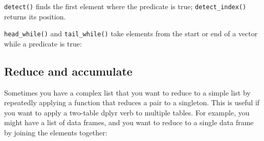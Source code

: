 \documentclass[]{book}
\newenvironment{Shaded}{\begin{snugshade}}{\end{snugshade}}
\newcommand{\KeywordTok}[1]{\textcolor[rgb]{0.13,0.29,0.53}{\textbf{{#1}}}}
\newcommand{\DecValTok}[1]{\textcolor[rgb]{0.00,0.00,0.81}{{#1}}}
\newcommand{\StringTok}[1]{\textcolor[rgb]{0.31,0.60,0.02}{{#1}}}
\newcommand{\CommentTok}[1]{\textcolor[rgb]{0.56,0.35,0.01}{\textit{{#1}}}}
\newcommand{\NormalTok}[1]{{#1}}
\begin{document}
\texttt{detect()} finds the first element where the predicate is true;
\texttt{detect\_index()} returns its position.

\begin{Shaded}
\end{Shaded}

\texttt{head\_while()} and \texttt{tail\_while()} take elements from the
start or end of a vector while a predicate is true:

\begin{Shaded}
\end{Shaded}

\subsection{Reduce and accumulate}\label{reduce-and-accumulate}

Sometimes you have a complex list that you want to reduce to a simple
list by repeatedly applying a function that reduces a pair to a
singleton. This is useful if you want to apply a two-table dplyr verb to
multiple tables. For example, you might have a list of data frames, and
you want to reduce to a single data frame by joining the elements
together:
\end{document}
